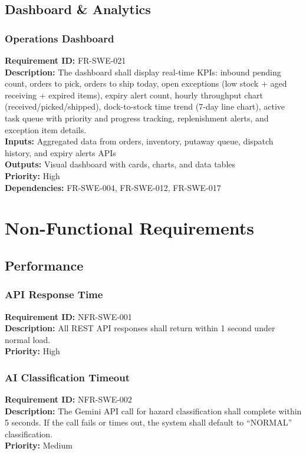 \documentclass[12pt,a4paper]{report}
\begin{document}
\section{Dashboard \& Analytics}

\subsection{Operations Dashboard}
\noindent\textbf{Requirement ID:} FR-SWE-021\\
\textbf{Description:} The dashboard shall display real-time KPIs: inbound pending count, orders to pick, orders to ship today, open exceptions (low stock + aged receiving + expired items), expiry alert count, hourly throughput chart (received/picked/shipped), dock-to-stock time trend (7-day line chart), active task queue with priority and progress tracking, replenishment alerts, and exception item details.\\
\textbf{Inputs:} Aggregated data from orders, inventory, putaway queue, dispatch history, and expiry alerts APIs\\
\textbf{Outputs:} Visual dashboard with cards, charts, and data tables\\
\textbf{Priority:} High\\
\textbf{Dependencies:} FR-SWE-004, FR-SWE-012, FR-SWE-017

\chapter{Non-Functional Requirements}

\section{Performance}

\subsection{API Response Time}
\noindent\textbf{Requirement ID:} NFR-SWE-001\\
\textbf{Description:} All REST API responses shall return within 1 second under normal load.\\
\textbf{Priority:} High

\subsection{AI Classification Timeout}
\noindent\textbf{Requirement ID:} NFR-SWE-002\\
\textbf{Description:} The Gemini API call for hazard classification shall complete within 5 seconds. If the call fails or times out, the system shall default to ``NORMAL'' classification.\\
\textbf{Priority:} Medium
\end{document}

